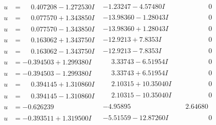 \documentclass[1p]{elsarticle_modified}
\theoremstyle{definition}
\begin{document}
$$\begin{array}{c|c|c}
\begin{aligned}
u &= \phantom{-}0.407208 - 1.272530 I\end{aligned}
 & -1.23247 - 4.57480 I & \phantom{-0.000000 } 0 \\ \hline\begin{aligned}
u &= \phantom{-}0.077570 + 1.343850 I\end{aligned}
 & -13.98360 - 1.28043 I & \phantom{-0.000000 } 0 \\ \hline\begin{aligned}
u &= \phantom{-}0.077570 - 1.343850 I\end{aligned}
 & -13.98360 + 1.28043 I & \phantom{-0.000000 } 0 \\ \hline\begin{aligned}
u &= \phantom{-}0.163062 + 1.343750 I\end{aligned}
 & -12.9213 + 7.8353 I & \phantom{-0.000000 } 0 \\ \hline\begin{aligned}
u &= \phantom{-}0.163062 - 1.343750 I\end{aligned}
 & -12.9213 - 7.8353 I & \phantom{-0.000000 } 0 \\ \hline\begin{aligned}
u &= -0.394503 + 1.299380 I\end{aligned}
 & \phantom{-}3.33743 - 6.51954 I & \phantom{-0.000000 } 0 \\ \hline\begin{aligned}
u &= -0.394503 - 1.299380 I\end{aligned}
 & \phantom{-}3.33743 + 6.51954 I & \phantom{-0.000000 } 0 \\ \hline\begin{aligned}
u &= \phantom{-}0.394145 + 1.310860 I\end{aligned}
 & \phantom{-}2.10315 + 10.35040 I & \phantom{-0.000000 } 0 \\ \hline\begin{aligned}
u &= \phantom{-}0.394145 - 1.310860 I\end{aligned}
 & \phantom{-}2.10315 - 10.35040 I & \phantom{-0.000000 } 0 \\ \hline\begin{aligned}
u &= -0.626239\phantom{ +0.000000I}\end{aligned}
 & -4.95895\phantom{ +0.000000I} & \phantom{-}2.64680\phantom{ +0.000000I} \\ \hline\begin{aligned}
u &= -0.393511 + 1.319500 I\end{aligned}
 & -5.51559 - 12.87260 I & \phantom{-0.000000 } 0 \\ \hline\begin{aligned}

\end{aligned}
\end{array}$$
\end{document}
